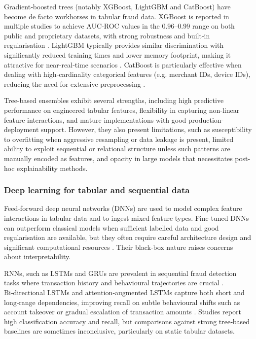 \documentclass[a4paper,fleqn]{cas-dc}
\begin{document}
Gradient‑boosted trees (notably XGBoost, LightGBM and CatBoost) have become de facto workhorses in tabular fraud data. XGBoost is reported in multiple studies to achieve AUC‑ROC values in the 0.96–0.99 range on both public and proprietary datasets, with strong robustness and built‑in regularisation \cite{alsowail_optimizing_2025, zhao_improved_2024, tayebi_novel_2025, sivasubramanian_predicting_2024}. 
LightGBM typically provides similar discrimination with significantly reduced training times \cite{marazqah_btoush_enhancing_2025, han_enhanced_2025} and lower memory footprint, making it attractive for near‑real‑time scenarios \cite{hashemi_fraud_2023, zhao_improved_2024, ravindranath_evaluation_2024}. 
CatBoost is particularly effective when dealing with high‑cardinality categorical features (e.g. merchant IDs, device IDs), reducing the need for extensive preprocessing \cite{alsowail_optimizing_2025}.

Tree-based ensembles exhibit several strengths, including high predictive performance on engineered tabular features, flexibility in capturing non-linear feature interactions, and mature implementations with good production-deployment support. 
However, they also present limitations, such as susceptibility to overfitting when aggressive resampling or data leakage is present, limited ability to exploit sequential or relational structure unless such patterns are manually encoded as features, and opacity in large models that necessitates post-hoc explainability methods.

\subsubsection{Deep learning for tabular and sequential data}

Feed‑forward deep neural networks (DNNs) are used to model complex feature interactions in tabular data and to ingest mixed feature types. 
Fine‑tuned DNNs can outperform classical models when sufficient labelled data and good regularisation are available, but they often require careful architecture design and significant computational resources \cite{krishnavardhan_intelligent_2024, de_zarza_optimizing_2023}. 
Their black‑box nature raises concerns about interpretability.

RNNs, such as LSTMs and GRUs are prevalent in sequential fraud detection tasks where transaction history and behavioural trajectories are crucial \cite{karthikeyan_intelligent_2023, akour_hybrid_2025, zioviris_intelligent_2024, alam_intelligent_2023, sivasubramanian_predicting_2024, sobana_sophisticated_2025, wei_evaluation_2023}. 
Bi‑directional LSTMs and attention‑augmented LSTMs capture both short and long‑range dependencies, improving recall on subtle behavioural shifts such as account takeover or gradual escalation of transaction amounts \cite{sulaiman_credit_2024, hu_hybrid_2025, ranganatha_enhancing_2025}. 
Studies report high classification accuracy and recall, but comparisons against strong tree‑based baselines are sometimes inconclusive, particularly on static tabular datasets.
\end{document}
